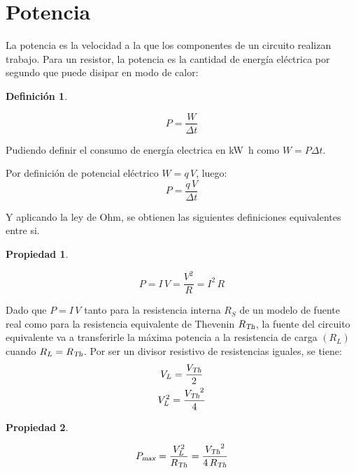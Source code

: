 \documentclass[a5paper,12pt,twoside]{book}
\newtheorem{defn}{{Definición}}[chapter]
\newtheorem{prop}{{Propiedad}}[chapter]
\begin{document}
\section{Potencia}

La potencia es la velocidad a la que los componentes de un circuito realizan trabajo. Para un resistor, la potencia es la cantidad de energía eléctrica por segundo que puede disipar en modo de calor:

\begin{mdframed}[style=MyFrame1]
    \begin{defn}
    \end{defn}
    \begin{equation*}
        P = \frac{W}{\Delta t}
    \end{equation*}
\end{mdframed}

Pudiendo definir el consumo de energía electrica en \si{\kilo\watt\hour} como $W = P \Delta t$.

Por definición de potencial eléctrico $W = q \, V$, luego:
\begin{equation*}
    P = \frac{q \, V}{\Delta t}
\end{equation*}

Y aplicando la ley de Ohm, se obtienen las siguientes definiciones equivalentes entre si.

\begin{mdframed}[style=MyFrame1]
    \begin{prop}
    \end{prop}
    \begin{equation*}
        P = I \, V = \frac{V^2}{R} = I^2 \, R
    \end{equation*}
\end{mdframed}

Dado que $P = I \, V$ tanto para la resistencia interna $R_S$ de un modelo de fuente real como para la resistencia equivalente de Thevenin ${{R}_\textsl{{Th}}}$, la fuente del circuito equivalente va a transferirle la máxima potencia a la resistencia de carga $(R_L)$ cuando $R_L={{R}_\textsl{{Th}}}$. Por ser un divisor resistivo de resistencias iguales, se tiene:
\begin{gather*}
    V_L = \frac{{{V}_\textsl{{Th}}}}{2}
    \\
    V_L^2 = \frac{{{V}_\textsl{{Th}}}^2}{4}
\end{gather*}

\begin{mdframed}[style=MyFrame1]
    \begin{prop}
    \end{prop}
    \begin{equation*}
        {{P}_\textsl{{max}}} = \frac{V_L^2}{{{R}_\textsl{{Th}}}} = \frac{{{V}_\textsl{{Th}}}^2}{4 \, {{R}_\textsl{{Th}}}}
    \end{equation*}
\end{mdframed}
\end{document}
